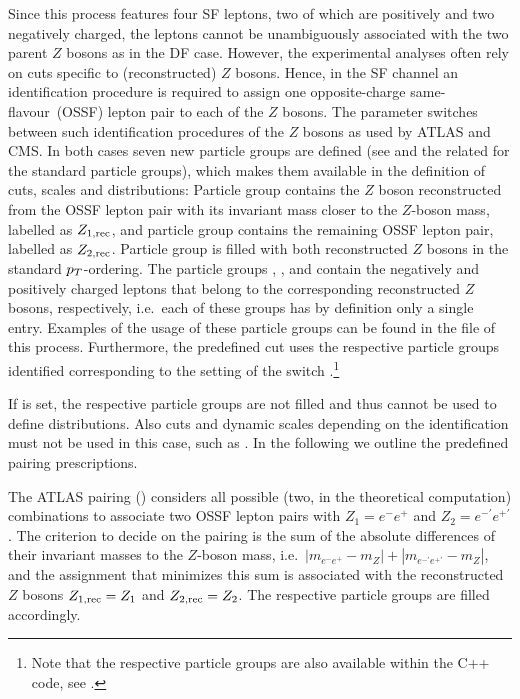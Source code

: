 \documentclass[english,11pt]{article}
\begin{document}
Since this process features four SF leptons, two of which are positively and two negatively charged, the leptons
cannot be unambiguously associated with the two parent $Z$ bosons as in the DF case. However, the experimental analyses 
often rely on cuts specific to (reconstructed) $Z$ bosons. Hence, in the SF channel an identification procedure is required  
to assign one opposite-charge same-flavour~(OSSF) lepton pair to each of the $Z$ bosons. The parameter  
switches between such identification procedures of the $Z$ bosons as used by ATLAS and CMS. 
In both cases seven new particle groups are defined (see  and the related  
for the standard particle groups), which makes them available in the definition of cuts, scales and distributions: 
Particle group  contains the $Z$ boson reconstructed from the OSSF lepton pair
with its invariant mass closer to the $Z$-boson mass, labelled as $Z_{1,\rm rec}$,
and particle group  contains the remaining OSSF lepton pair, labelled as $Z_{2,\rm rec}$.
Particle group  is filled with both reconstructed $Z$ bosons in the standard $p_T$-ordering. The particle groups , ,  and  contain the negatively and positively charged leptons that belong to the corresponding reconstructed $Z$ bosons, respectively, i.e.\ each of these groups has by definition only a single entry. Examples of the usage of these particle groups can be found in 
the file  of this process. Furthermore, the predefined cut  uses 
the respective particle groups identified corresponding to the setting of the switch .\footnote{Note that the respective 
particle groups are also available within the C++ code, see .}

If  is set, the respective particle groups are not filled and thus cannot be used to define distributions.
Also cuts and dynamic scales depending on the identification must not be used in this case, such as . 
In the following we outline the predefined pairing prescriptions.

The ATLAS pairing () considers all possible (two, in the theoretical computation) combinations to associate two OSSF lepton pairs with $Z_{1}=e^-e^+$ and $Z_{2}=e^{-\prime}e^{+\prime}$. 
The criterion to decide on the pairing is the sum of the absolute differences of their invariant masses to 
the $Z$-boson mass, i.e.\ $\left| m_{e^-e^+}-m_Z\right|+\left|m_{e^{-\prime}e^{+\prime}}-m_Z\right|$,
and the assignment that
minimizes this sum is associated with the reconstructed $Z$ bosons $Z_{1,\rm rec}=Z_{1}$ and  $Z_{2,\rm rec}=Z_{2}$. The 
respective particle groups are filled accordingly.
\end{document}
